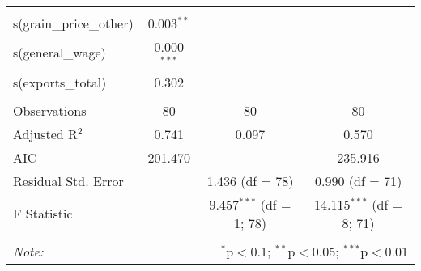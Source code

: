\begin{table}[!htbp]
\begin{tabular}{@{\extracolsep{5pt}}lccc}
    \hline \\[-1.8ex]
    s(grain\_price\_other) & 0.003$^{**}$ & & \\
    s(general\_wage) & 0.000$^{***}$ & & \\
    s(exports\_total) & 0.302 & & \\
    \hline \\[-1.8ex]
    Observations & 80 & 80 & 80 \\
    Adjusted R$^{2}$ & 0.741 & 0.097 & 0.570 \\
    AIC & 201.470 & & 235.916 \\
    Residual Std. Error & & 1.436 (df = 78) & 0.990 (df = 71) \\
    F Statistic & & 9.457$^{***}$ (df = 1; 78) & 14.115$^{***}$ (df = 8; 71) \\
    \hline
    \hline \\[-1.8ex]
    \textit{Note:}  & \multicolumn{3}{r}{$^{*}$p$<$0.1; $^{**}$p$<$0.05; $^{***}$p$<$0.01} \\
    \end{tabular}
\end{table}

